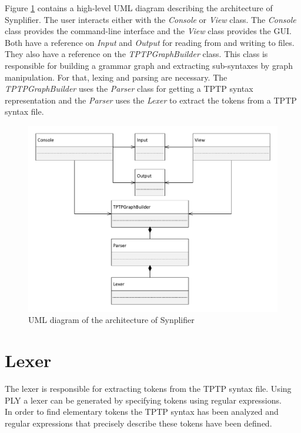 Figure \ref{fig:ConceptArchitectureOverview} contains a high-level UML diagram describing the architecture of \ac{Synplifier}. The user interacts either with the \textit{Console} or \textit{View} class. The \textit{Console} class provides the command-line interface and the \textit{View} class provides the GUI. Both have a reference on \textit{Input} and \textit{Output} for reading from and writing to files. They also have a reference on the \textit{TPTPGraphBuilder} class. This class is responsible for building a grammar graph and extracting sub-syntaxes by graph manipulation. For that, lexing and parsing are necessary. The \textit{TPTPGraphBuilder} uses the \textit{Parser} class for getting a \ac{TPTP} syntax representation and the \textit{Parser} uses the \textit{Lexer} to extract the tokens from a \ac{TPTP} syntax file.
\begin{figure}[H]
\centering
\includegraphics[width=1\textwidth]{images/Concept_UML_Architecture_Overview.pdf}
\caption{UML diagram of the architecture of \ac{Synplifier}}
\label{fig:ConceptArchitectureOverview}
\end{figure}

\section{Lexer}\label{sec:ConceptLexer}
The lexer is responsible for extracting tokens from the \ac{TPTP} syntax file. Using \ac{PLY} a lexer can be generated by specifying tokens using regular expressions.\\
In order to find elementary tokens the \ac{TPTP} syntax has been analyzed and regular expressions that precisely describe these tokens have been defined.

